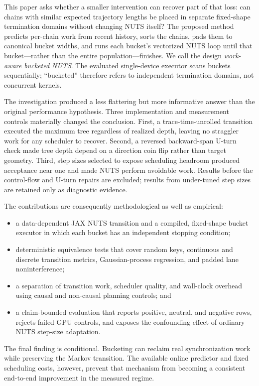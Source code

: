 \documentclass[conference]{IEEEtran}
\begin{document}
This paper asks whether a smaller intervention can recover part of that loss:
can chains with similar expected trajectory lengths be placed in separate
fixed-shape termination domains without changing NUTS itself?  The proposed
method predicts per-chain work from recent history, sorts the chains, pads them
to canonical bucket widths, and runs each bucket's vectorized NUTS loop until
that bucket---rather than the entire population---finishes.  We call the design \emph{work-aware bucketed NUTS}.  The evaluated
single-device executor scans buckets sequentially; ``bucketed'' therefore
refers to independent termination domains, not concurrent kernels.

The investigation produced a less flattering but more informative answer than
the original performance hypothesis.  Three implementation and measurement
controls materially changed the conclusion.  First, a trace-time-unrolled
transition executed the maximum tree regardless of realized depth, leaving no
straggler work for any scheduler to recover.  Second, a reversed backward-span
U-turn check made tree depth depend on a direction coin flip rather than target
geometry.  Third, step sizes selected to expose scheduling headroom produced
acceptance near one and made NUTS perform avoidable work.  Results before the
control-flow and U-turn repairs are excluded; results from under-tuned step
sizes are retained only as diagnostic evidence.

The contributions are consequently methodological as well as empirical:

\begin{itemize}
  \item a data-dependent JAX NUTS transition and a compiled, fixed-shape bucket
        executor in which each bucket has an independent stopping condition;
  \item deterministic equivalence tests that cover random keys, continuous and
        discrete transition metrics, Gaussian-process regression, and padded
        lane noninterference;
  \item a separation of transition work, scheduler quality, and wall-clock
        overhead using causal and non-causal planning controls; and
  \item a claim-bounded evaluation that reports positive, neutral, and negative
        rows, rejects failed GPU controls, and exposes the confounding effect of
        ordinary NUTS step-size adaptation.
\end{itemize}

The final finding is conditional.  Bucketing can reclaim real synchronization
work while preserving the Markov transition.  The available online predictor
and fixed scheduling costs, however, prevent that mechanism from becoming a
consistent end-to-end improvement in the measured regime.
\end{document}
